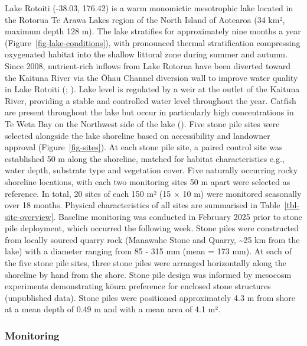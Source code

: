 \documentclass[
  letterpaper,
  DIV=11,
  numbers=noendperiod]{scrartcl}
\begin{document}
Lake Rotoiti (-38.03, 176.42) is a warm monomictic mesotrophic lake
located in the Rotorua Te Arawa Lakes region of the North Island of
Aotearoa (34 km², maximum depth 128 m). The lake stratifies for
approximately nine months a year ({Figure~\ref{fig-lake-conditions}}),
with pronounced thermal stratification compressing oxygenated habitat
into the shallow littoral zone during summer and autumn. Since 2008,
nutrient-rich inflows from Lake Rotorua have been diverted toward the
Kaituna River via the Ōhau Channel diversion wall to improve water
quality in Lake Rotoiti (; ). Lake level
is regulated by a weir at the outlet of the Kaituna River, providing a
stable and controlled water level throughout the year. Catfish are
present throughout the lake but occur in particularly high
concentrations in Te Weta Bay on the Northwest side of the lake
(). Five stone pile sites were
selected alongside the lake shoreline based on accessibility and
landowner approval (Figure~\ref{fig-sites}). At each stone pile site, a
paired control site was established 50 m along the shoreline, matched
for habitat characteristics e.g., water depth, substrate type and
vegetation cover. Five naturally occurring rocky shoreline locations,
with each two monitoring sites 50 m apart were selected as reference. In
total, 20 sites of each 150 m² (15 × 10 m) were monitored seasonally
over 18 months. Physical characteristics of all sites are summarised in
Table~\ref{tbl-site-overview}. Baseline monitoring was conducted in
February 2025 prior to stone pile deployment, which occurred the
following week. Stone piles were constructed from locally sourced quarry
rock (Manawahe Stone and Quarry, \textasciitilde25 km from the lake)
with a diameter ranging from 85 - 315 mm (mean = 173 mm). At each of the
five stone pile sites, three stone piles were arranged horizontally
along the shoreline by hand from the shore. Stone pile design was
informed by mesocosm experiments demonstrating kōura preference for
enclosed stone structures (unpublished data). Stone piles were
positioned approximately 4.3 m from shore at a mean depth of 0.49 m and
with a mean area of 4.1 m².

\subsubsection{Monitoring}\label{monitoring}
\end{document}
